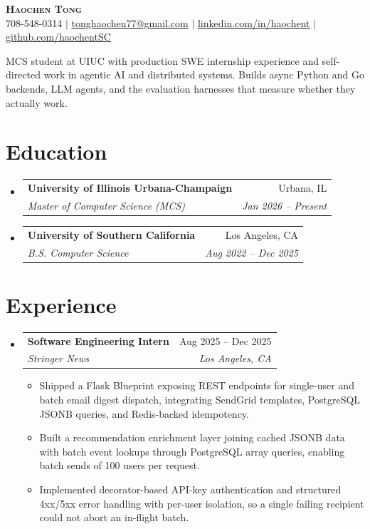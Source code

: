 \documentclass[letterpaper,11pt]{article}
\makeatletter
\newcommand{\resumeItem}[1]{
  \item\small{
    {#1 \vspace{-2pt}}
  }
}
\newcommand{\resumeSubheading}[4]{
  \vspace{-2pt}\item
    \begin{tabular*}{0.97\textwidth}[t]{l@{\extracolsep{\fill}}r}
      \textbf{#1} & #2 \\
      \textit{\small#3} & \textit{\small #4} \\
    \end{tabular*}\vspace{-7pt}
}
\newcommand{\resumeSubHeadingListStart}{\begin{itemize}[leftmargin=0.15in, label={}]}
\newcommand{\resumeSubHeadingListEnd}{\end{itemize}}
\newcommand{\resumeItemListStart}{\begin{itemize}}
\newcommand{\resumeItemListEnd}{\end{itemize}\vspace{-5pt}}
\makeatother
\begin{document}
\begin{center}
    \textbf{\Huge \scshape Haochen Tong} \\ \vspace{1pt}
    \small 708-548-0314 $|$ \href{mailto:tonghaochen77@gmail.com}{\underline{tonghaochen77@gmail.com}} $|$ \href{https://linkedin.com/in/haochent}{\underline{linkedin.com/in/haochent}} $|$ \href{https://github.com/haochentSC}{\underline{github.com/haochentSC}}
\end{center}

\vspace{-6pt}
\small MCS student at UIUC with production SWE internship experience and self-directed work in agentic AI and distributed systems. Builds async Python and Go backends, LLM agents, and the evaluation harnesses that measure whether they actually work.
\vspace{2pt}

\section{Education}
  \resumeSubHeadingListStart
    \resumeSubheading
      {University of Illinois Urbana-Champaign}{Urbana, IL}
      {Master of Computer Science (MCS)}{Jan 2026 -- Present}
    \resumeSubheading
      {University of Southern California}{Los Angeles, CA}
      {B.S. Computer Science}{Aug 2022 -- Dec 2025}
  \resumeSubHeadingListEnd

\section{Experience}
  \resumeSubHeadingListStart
\resumeSubheading
  {Software Engineering Intern}{Aug 2025 -- Dec 2025}
  {Stringer News}{Los Angeles, CA}
  \resumeItemListStart
    \resumeItem{Shipped a Flask Blueprint exposing REST endpoints for single-user and batch email digest dispatch, integrating SendGrid templates, PostgreSQL JSONB queries, and Redis-backed idempotency.}
    \resumeItem{Built a recommendation enrichment layer joining cached JSONB data with batch event lookups through PostgreSQL array queries, enabling batch sends of 100 users per request.}
    \resumeItem{Implemented decorator-based API-key authentication and structured 4xx/5xx error handling with per-user isolation, so a single failing recipient could not abort an in-flight batch.}
  \resumeItemListEnd
  \resumeSubHeadingListEnd

\end{document}
